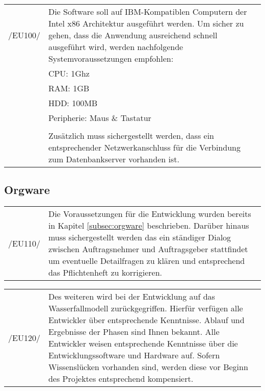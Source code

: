 \begin{tabular}{p{1.5cm}p{14.5cm}}

	 /EU100/ & Die Software soll auf IBM-Kompatiblen Computern der Intel x86 Architektur ausgeführt werden.
Um sicher zu gehen, dass die Anwendung ausreichend schnell ausgeführt wird, werden nachfolgende Systemvoraussetzungen empfohlen:\\

	&CPU: 1Ghz\\
	&RAM: 1GB\\
	&HDD: 100MB\\
	&Peripherie: Maus \& Tastatur\\
	&\\
	&Zusätzlich muss sichergestellt werden, dass ein entsprechender Netzwerkanschluss für die Verbindung zum Datenbankserver vorhanden ist.\\[0.25cm]

\end{tabular}

\subsection{Orgware}
\label{subsec:devorgware}

\begin{tabular}{p{1.5cm}p{14.5cm}}

	 /EU110/	&  Die Voraussetzungen für die Entwicklung wurden bereits in Kapitel \ref{subsec:orgware} beschrieben.
Darüber hinaus muss sichergestellt werden das ein ständiger Dialog zwischen Auftragsnehmer und Auftragsgeber stattfindet um eventuelle Detailfragen zu klären und entsprechend das Pflichtenheft zu korrigieren.\\[0.25cm]

\end{tabular}

\begin{tabular}{p{1.5cm}p{14.5cm}}

	 /EU120/	&  Des weiteren wird bei der Entwicklung auf das Wasserfallmodell zurückgegriffen. Hierfür verfügen alle Entwickler über entsprechende Kenntnisse. Ablauf und Ergebnisse der Phasen sind Ihnen bekannt. Alle Entwickler weisen entsprechende Kenntnisse über die Entwicklungssoftware und Hardware auf. Sofern Wissenslücken vorhanden sind, werden diese vor Beginn des Projektes entsprechend kompensiert.\\[0.25cm]

\end{tabular}





